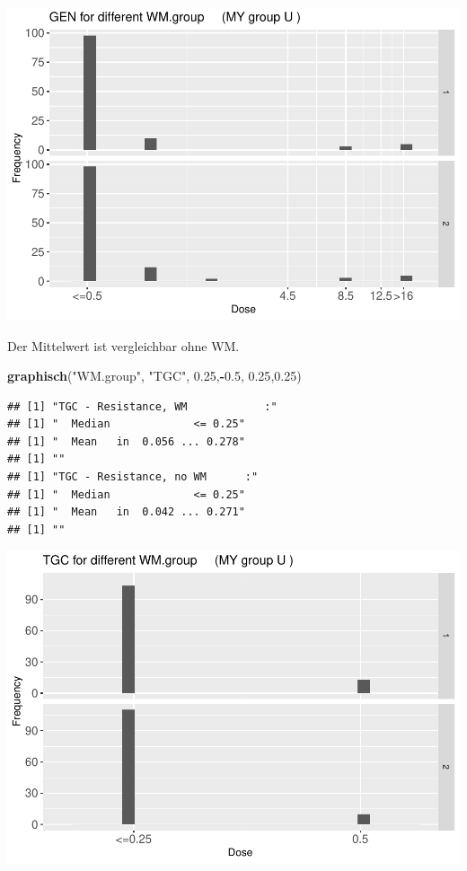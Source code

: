 \documentclass[
]{article}
\newenvironment{Shaded}{\begin{snugshade}}{\end{snugshade}}
\newcommand{\FloatTok}[1]{\textcolor[rgb]{0.00,0.00,0.81}{#1}}
\newcommand{\KeywordTok}[1]{\textcolor[rgb]{0.13,0.29,0.53}{\textbf{#1}}}
\newcommand{\NormalTok}[1]{#1}
\newcommand{\OperatorTok}[1]{\textcolor[rgb]{0.81,0.36,0.00}{\textbf{#1}}}
\newcommand{\StringTok}[1]{\textcolor[rgb]{0.31,0.60,0.02}{#1}}
\begin{document}
\includegraphics{Verteilungen_files/figure-latex/unnamed-chunk-35-1.pdf}

Der Mittelwert ist vergleichbar ohne WM.

\begin{Shaded}
\begin{Highlighting}[]
  \KeywordTok{graphisch}\NormalTok{(}\StringTok{"WM.group"}\NormalTok{, }\StringTok{"TGC"}\NormalTok{, }\FloatTok{0.25}\NormalTok{,}\OperatorTok{-}\FloatTok{0.5}\NormalTok{, }\FloatTok{0.25}\NormalTok{,}\FloatTok{0.25}\NormalTok{)  }
\end{Highlighting}
\end{Shaded}

\begin{verbatim}
## [1] "TGC - Resistance, WM            :"
## [1] "  Median             <= 0.25"
## [1] "  Mean   in  0.056 ... 0.278"
## [1] ""
## [1] "TGC - Resistance, no WM      :"
## [1] "  Median             <= 0.25"
## [1] "  Mean   in  0.042 ... 0.271"
## [1] ""
\end{verbatim}

\includegraphics{Verteilungen_files/figure-latex/unnamed-chunk-36-1.pdf}
\end{document}
